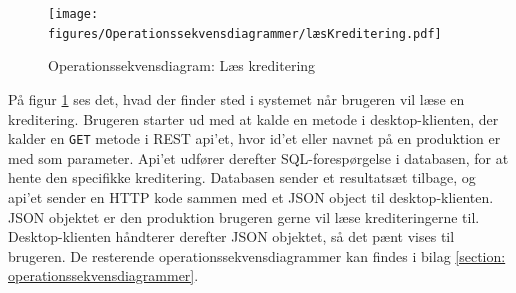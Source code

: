 \begin{figure}[H] %
\centering
\texttt{[image: figures/Operationssekvensdiagrammer/læsKreditering.pdf]}
\caption{Operationssekvensdiagram: Læs kreditering}
\label{fig:op_read_credit}
\end{figure}


På figur \ref{fig:op_read_credit} ses det, hvad der finder sted i systemet når brugeren vil læse en kreditering. Brugeren starter ud med at kalde en metode i desktop-klienten, der kalder en \texttt{GET} metode i REST api'et, hvor id'et eller navnet på en produktion er med som parameter. Api'et udfører derefter SQL-forespørgelse i databasen, for at hente den specifikke kreditering. Databasen sender et resultatsæt tilbage, og api'et sender en HTTP kode sammen med et JSON object til desktop-klienten. JSON objektet er den produktion brugeren gerne vil læse krediteringerne til. Desktop-klienten håndterer derefter JSON objektet, så det pænt vises til brugeren. De resterende operationssekvensdiagrammer kan findes i bilag \ref{section: operationssekvensdiagrammer}.







